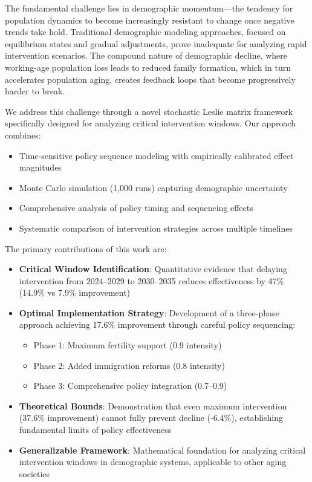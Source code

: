 \documentclass{article} %
\begin{document}
The fundamental challenge lies in demographic momentum---the tendency for population dynamics to become increasingly resistant to change once negative trends take hold. Traditional demographic modeling approaches, focused on equilibrium states and gradual adjustments, prove inadequate for analyzing rapid intervention scenarios. The compound nature of demographic decline, where working-age population loss leads to reduced family formation, which in turn accelerates population aging, creates feedback loops that become progressively harder to break.

We address this challenge through a novel stochastic Leslie matrix framework specifically designed for analyzing critical intervention windows. Our approach combines:
\begin{itemize}
    \item Time-sensitive policy sequence modeling with empirically calibrated effect magnitudes
    \item Monte Carlo simulation (1,000 runs) capturing demographic uncertainty
    \item Comprehensive analysis of policy timing and sequencing effects
    \item Systematic comparison of intervention strategies across multiple timelines
\end{itemize}

The primary contributions of this work are:
\begin{itemize}
    \item \textbf{Critical Window Identification}: Quantitative evidence that delaying intervention from 2024--2029 to 2030--2035 reduces effectiveness by 47\% (14.9\% vs 7.9\% improvement)
    \item \textbf{Optimal Implementation Strategy}: Development of a three-phase approach achieving 17.6\% improvement through careful policy sequencing:
        \begin{itemize}
            \item Phase 1: Maximum fertility support (0.9 intensity)
            \item Phase 2: Added immigration reforms (0.8 intensity)
            \item Phase 3: Comprehensive policy integration (0.7--0.9)
        \end{itemize}
    \item \textbf{Theoretical Bounds}: Demonstration that even maximum intervention (37.6\% improvement) cannot fully prevent decline (-6.4\%), establishing fundamental limits of policy effectiveness
    \item \textbf{Generalizable Framework}: Mathematical foundation for analyzing critical intervention windows in demographic systems, applicable to other aging societies
\end{itemize}
\end{document}
